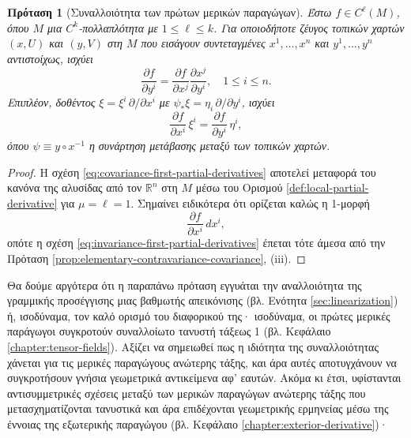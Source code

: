 \documentclass[11pt,a4paper,twoside,openright]{book}
\newtheorem{proposition}[lemma]{Πρόταση}
\begin{document}
\begin{proposition}[Συναλλοιότητα των πρώτων μερικών παραγώγων]\label{prop:covariance-first-partial-derivatives}
Έστω
$f \in C^\ell(M)$,
όπου $Μ$ μια $C^k$-πολλαπλότητα με $1 \le \ell \le k$.
Για οποιοδήποτε ζέυγος τοπικών χαρτών
$(x, U)$ και $(y, V)$ στη $M$
που εισάγουν συντεταγμένες
$x^1, \dots, x^n$ και $y^1, \dots, y^n$ αντιστοίχως, ισχύει
\begin{equation}\label{eq:covariance-first-partial-derivatives}
\frac{\partial f}{\partial y^i}
=
\frac{\partial f}{\partial x^j}
\frac{\partial x^j}{\partial y^i},
\quad
1 \le i \le n.
\end{equation}
Επιπλέον, δοθέντος $\xi = \xi^i \, \partial/\partial x^i$ με
$\psi_* \xi = \eta_i \, \partial/\partial y^i$,
ισχύει
\begin{equation}\label{eq:invariance-first-partial-derivatives}
\frac{\partial f}{\partial x^i}\, \xi^i
=
\frac{\partial f}{\partial y^i}\, \eta^i,
\end{equation}
όπου $\psi \equiv y \circ x^{-1}$ η συνάρτηση μετάβασης
μεταξύ των τοπικών χαρτών.
\end{proposition}
\begin{proof}
Η σχέση \eqref{eq:covariance-first-partial-derivatives} αποτελεί μεταφορά του κανόνα της αλυσίδας από τον $\mathbb{R}^n$ στη $Μ$ μέσω του Ορισμού \ref{def:local-partial-derivative} για $\mu = \ell = 1$.
Σημαίνει ειδικότερα ότι ορίζεται καλώς η 1-μορφή
\begin{equation*}
\frac{\partial f}{\partial x^i} \, dx^i,
\end{equation*}
οπότε η σχέση \eqref{eq:invariance-first-partial-derivatives}
έπεται τότε άμεσα από την Πρόταση \ref{prop:elementary-contravariance-covariance}, (iii).
\end{proof}
\noindent
Θα δούμε αργότερα ότι η παραπάνω πρόταση εγγυάται την αναλλοιότητα της γραμμικής προσέγγισης μιας βαθμωτής απεικόνισης (βλ. Ενότητα \ref{sec:linearization})
ή, ισοδύναμα, τον καλό ορισμό του διαφορικού της·
ισοδύναμα, οι πρώτες μερικές παράγωγοι
συγκροτούν συναλλοίωτο τανυστή τάξεως 1 (βλ. Κεφάλαιο \ref{chapter:tensor-fields}).
Αξίζει να σημειωθεί πως η ιδιότητα της συναλλοιότητας χάνεται για τις μερικές παραγώγους ανώτερης τάξης,
και άρα αυτές αποτυγχάνουν να συγκροτήσουν γνήσια γεωμετρικά αντικείμενα αφ' εαυτών. Ακόμα κι έτσι, υφίστανται αντισυμμετρικές σχέσεις μεταξύ των μερικών παραγώγων ανώτερης τάξης που μετασχηματίζονται τανυστικά
και άρα επιδέχονται γεωμετρικής ερμηνείας μέσω της έννοιας της εξωτερικής παραγώγου (βλ. Κεφάλαιο \ref{chapter:exterior-derivative})·
\end{document}
